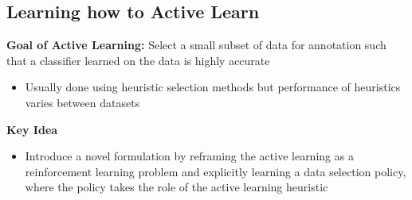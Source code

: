 \documentclass[10pt]{article}
\begin{document}
\subsection*{Learning how to Active Learn}
\textbf{Goal of Active Learning:} Select a small subset of data for annotation such that a classifier learned on the data is highly accurate
\begin{itemize}
	\item Usually done using heuristic selection methods but performance of heuristics varies between datasets
\end{itemize}
\textbf{Key Idea}
\begin{itemize}
	\item Introduce a novel formulation by reframing the active learning as a reinforcement learning problem and explicitly learning a data selection policy, where the policy takes the role of the active learning heuristic
\end{itemize}
\end{document}
